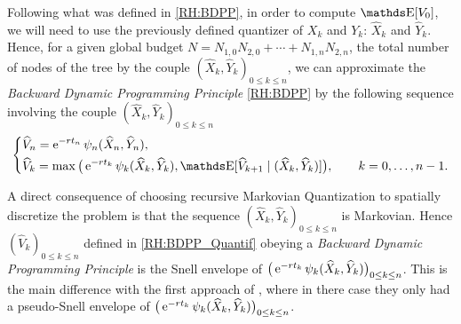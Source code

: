 Following what was defined in \eqref{RH:BDPP}, in order to compute $\E [ V_0 ]$, we will need to use the previously defined quantizer of $X_k$ and $Y_k$: $\widehat X_k$ and $\widehat Y_k$. Hence, for a given global budget $N = N_{1,0} N_{2,0} + \cdots + N_{1,n} N_{2,n}$, the total number of nodes of the tree by the couple $(\widehat X_k, \widehat Y_k)_{0 \leq k \leq n}$, we can approximate the \textit{Backward Dynamic Programming Principle} \eqref{RH:BDPP} by the following sequence involving the couple $(\widehat{X}_k, \widehat Y_k )_{0 \leq k \leq n}$
\begin{equation} \label{RH:BDPP_Quantif}
	\left\{ \begin{aligned}
		 & \widehat V_n = \e^{-r t_n} \psi_n ( \widehat X_n, \widehat Y_n ),                                                                                                     \\
		 & \widehat V_k = \max \big( \e^{-r t_k} \psi_k(\widehat X_k, \widehat Y_k), \E [ \widehat V_{k+1} \mid ( \widehat X_k, \widehat Y_k ) ] \big),\qquad k = 0, \dots, n-1.
	\end{aligned} \right.
\end{equation}
\begin{remark}
	A direct consequence of choosing recursive Markovian Quantization to spatially discretize the problem is that the sequence $(\widehat{X}_k, \widehat Y_k )_{0 \leq k \leq n}$ is Markovian. Hence $(\widehat V_k)_{0 \leq k \leq n}$ defined in \eqref{RH:BDPP_Quantif} obeying a \textit{Backward Dynamic Programming Principle} is the Snell envelope of $\big( \operatorname{e}^{ - r t_k } \psi_k ( \widehat X_k, \widehat Y_k ) \big)_{0 \leq k \leq n}$. This is the main difference with the first approach of \cite{printems2005quantization,bally2003quantization}, where in there case they only had a pseudo-Snell envelope of $\big( \operatorname{e}^{ - r t_k } \psi_k ( \widehat X_k, \widehat Y_k ) \big)_{0 \leq k \leq n}$.
\end{remark}


